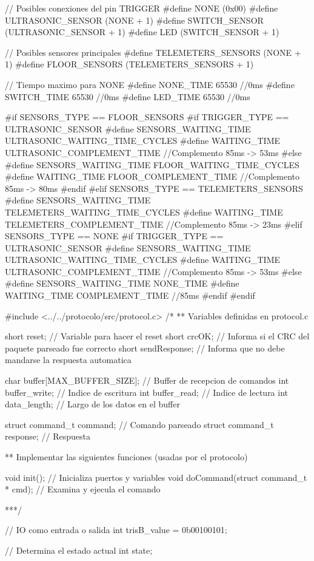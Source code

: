 {\begin{verbatimtab}
// Posibles conexiones del pin TRIGGER
#define NONE			  (0x00)
#define ULTRASONIC_SENSOR (NONE + 1)
#define SWITCH_SENSOR     (ULTRASONIC_SENSOR + 1)
#define LED				  (SWITCH_SENSOR + 1)

// Posibles sensores principales
#define TELEMETERS_SENSORS (NONE + 1)
#define FLOOR_SENSORS      (TELEMETERS_SENSORS + 1)

// Tiempo maximo para NONE
#define NONE_TIME	65530 //0ms
#define SWITCH_TIME 65530 //0ms
#define LED_TIME 	65530 //0ms

#if SENSORS_TYPE == FLOOR_SENSORS
	#if TRIGGER_TYPE == ULTRASONIC_SENSOR
		#define SENSORS_WAITING_TIME ULTRASONIC_WAITING_TIME_CYCLES
		#define WAITING_TIME ULTRASONIC_COMPLEMENT_TIME //Complemento 85ms -> 53ms
	#else
		#define SENSORS_WAITING_TIME FLOOR_WAITING_TIME_CYCLES
		#define WAITING_TIME FLOOR_COMPLEMENT_TIME //Complemento 85ms -> 80ms
	#endif
#elif SENSORS_TYPE == TELEMETERS_SENSORS
	#define SENSORS_WAITING_TIME TELEMETERS_WAITING_TIME_CYCLES
	#define WAITING_TIME TELEMETERS_COMPLEMENT_TIME //Complemento 85ms -> 23ms
#elif SENSORS_TYPE == NONE
	#if TRIGGER_TYPE == ULTRASONIC_SENSOR
		#define SENSORS_WAITING_TIME ULTRASONIC_WAITING_TIME_CYCLES
		#define WAITING_TIME ULTRASONIC_COMPLEMENT_TIME //Complemento 85ms -> 53ms
	#else
		#define SENSORS_WAITING_TIME NONE_TIME
		#define WAITING_TIME COMPLEMENT_TIME //85ms
	#endif
#endif

#include <../../protocolo/src/protocol.c>
/*
** Variables definidas en protocol.c

short reset; // Variable para hacer el reset
short crcOK; // Informa si el CRC del paquete parseado fue correcto
short sendResponse; // Informa que no debe mandarse la respuesta automatica

char buffer[MAX_BUFFER_SIZE];	// Buffer de recepcion de comandos
int buffer_write;				// Indice de escritura
int buffer_read;				// Indice de lectura
int data_length;				// Largo de los datos en el buffer

struct command_t command; 	// Comando parseado
struct command_t response; 	// Respuesta

** Implementar las siguientes funciones (usadas por el protocolo)

void init(); // Inicializa puertos y variables
void doCommand(struct command_t * cmd); // Examina y ejecula el comando

***/

// IO como entrada o salida
int trisB_value = 0b00100101;

// Determina el estado actual
int state;


\end{verbatimtab}}
